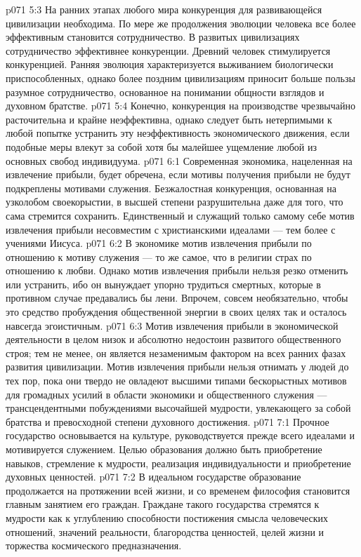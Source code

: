 \vs p071 5:3 На ранних этапах любого мира конкуренция для развивающейся цивилизации необходима. По мере же продолжения эволюции человека все более эффективным становится сотрудничество. В развитых цивилизациях сотрудничество эффективнее конкуренции. Древний человек стимулируется конкуренцией. Ранняя эволюция характеризуется выживанием биологически приспособленных, однако более поздним цивилизациям приносит больше пользы разумное сотрудничество, основанное на понимании общности взглядов и духовном братстве.
\vs p071 5:4 Конечно, конкуренция на производстве чрезвычайно расточительна и крайне неэффективна, однако следует быть нетерпимыми к любой попытке устранить эту неэффективность экономического движения, если подобные меры влекут за собой хотя бы малейшее ущемление любой из основных свобод индивидуума.
\vs p071 6:1 Современная экономика, нацеленная на извлечение прибыли, будет обречена, если мотивы получения прибыли не будут подкреплены мотивами служения. Безжалостная конкуренция, основанная на узколобом своекорыстии, в высшей степени разрушительна даже для того, что сама стремится сохранить. Единственный и служащий только самому себе мотив извлечения прибыли несовместим с христианскими идеалами --- тем более с учениями Иисуса.
\vs p071 6:2 В экономике мотив извлечения прибыли по отношению к мотиву служения --- то же самое, что в религии страх по отношению к любви. Однако мотив извлечения прибыли нельзя резко отменить или устранить, ибо он вынуждает упорно трудиться смертных, которые в противном случае предавались бы лени. Впрочем, совсем необязательно, чтобы это средство пробуждения общественной энергии в своих целях так и осталось навсегда эгоистичным.
\vs p071 6:3 Мотив извлечения прибыли в экономической деятельности в целом низок и абсолютно недостоин развитого общественного строя; тем не менее, он является незаменимым фактором на всех ранних фазах развития цивилизации. Мотив извлечения прибыли нельзя отнимать у людей до тех пор, пока они твердо не овладеют высшими типами бескорыстных мотивов для громадных усилий в области экономики и общественного служения --- трансцендентными побуждениями высочайшей мудрости, увлекающего за собой братства и превосходной степени духовного достижения.
\vs p071 7:1 Прочное государство основывается на культуре, руководствуется прежде всего идеалами и мотивируется служением. Целью образования должно быть приобретение навыков, стремление к мудрости, реализация индивидуальности и приобретение духовных ценностей.
\vs p071 7:2 В идеальном государстве образование продолжается на протяжении всей жизни, и со временем философия становится главным занятием его граждан. Граждане такого государства стремятся к мудрости как к углублению способности постижения смысла человеческих отношений, значений реальности, благородства ценностей, целей жизни и торжества космического предназначения.
